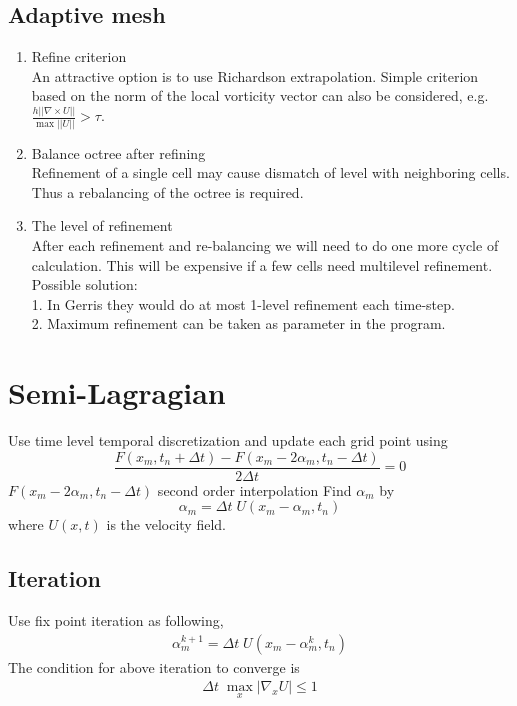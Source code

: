 \documentclass[PROP,PDF]{prop} %
\begin{document}
\subsection{Adaptive mesh}
\begin{enumerate}
\item Refine criterion\\
An attractive option is to use Richardson extrapolation. Simple criterion based on the norm of the local vorticity vector can also be considered, e.g. $\frac{h||\nabla \times U||}{\max||U||}>\tau$. \cite{GE}
\item Balance octree after refining\\
Refinement of a single cell may cause dismatch of level with neighboring cells. Thus a rebalancing of the octree is required. \cite{OM1}\cite{OM2} 
\item The level of refinement\\
After each refinement and re-balancing we will need to do one more cycle of calculation. This will be expensive if a few cells need multilevel refinement.\\ 
Possible solution:\\
1. In Gerris they would do at most 1-level refinement each time-step.\\
2. Maximum refinement can be taken as parameter in the program. 
\end{enumerate}
 

\section{Semi-Lagragian}
Use time level temporal discretization and update each grid point using
\begin{equation}
\frac{F(x_m,t_n+\Delta t)-F(x_m-2\alpha_m,t_n-\Delta t)}{2\Delta t}=0
\end{equation} 
$F(x_m-2\alpha_m,t_n-\Delta t)$ second order interpolation 
Find $\alpha_m$ by
\begin{equation}
\alpha_m=\Delta t\; U(x_m-\alpha_m,t_n)
\end{equation}
where $U(x,t)$ is the velocity field.
\subsection{Iteration}
Use fix point iteration as following,
\begin{eqnarray}
\alpha_{m}^{k+1} = \Delta t\; U (x_m - \alpha_m^{k},t_n)
\end{eqnarray}
The condition for above iteration to converge is
\begin{eqnarray}
\Delta t \; \max_x |\nabla_x U| \le 1
\end{eqnarray}
\end{document}
